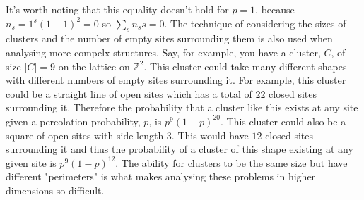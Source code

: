 It's worth noting that this equality doesn't hold for $p=1$, because $n_s=1^s(1-1)^2=0$ so $\sum_sn_ss = 0$. The technique of considering the sizes of clusters and the number of
empty sites surrounding them is also used when analysing more compelx structures. Say, for example, you have a cluster, $C$, of size $|C|=9$ on the lattice on $\mathbb{Z}^2$. This
cluster could take many different shapes with different numbers of empty sites surrounding it. For example, this cluster could be a straight line of open sites which has a total of
$22$ closed sites surrounding it. Therefore the probability that a cluster like this exists at any site given a percolation probability, $p$, is $p^{9}(1-p)^{20}$. This cluster could also be a
square of open sites with side length $3$. This would have $12$ closed sites surrounding it and thus the probability of a cluster of this shape existing at any given site is
$p^{9}(1-p)^{12}$. The ability for clusters to be the same size but have different "perimeters" is what makes analysing these problems in higher dimensions so difficult.
